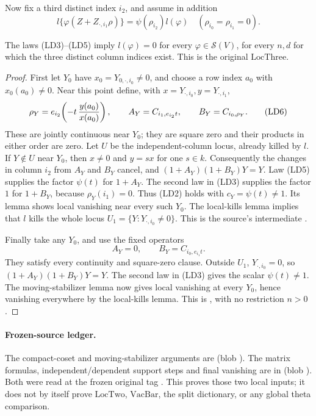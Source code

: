 Now fix a third distinct index \(i_2\), and assume in addition
\[
 l\{\varphi(Z+Z_{\cdot,i_1}\rho)\}
       =\psi(\rho_{i_2})l(\varphi)
                \quad(\rho_{i_0}=\rho_{i_1}=0).
 \tag{LD5}\label{eq:sr-source-second-column-law}
\]

\begin{srproposition}
\label{prop:sr-source-local-three}
The laws (LD3)--(LD5) imply \(l(\varphi)=0\) for every
\(\varphi\in\mathcal S(V)\), for every \(n,d\) for which the
three distinct column indices exist.
This is the original \(\mathrm{LocThree}\).
\end{srproposition}
\begin{proof}
First let \(Y_0\) have \(x_0=Y_{0,\cdot,i_0}\ne0\),
and choose a row index \(a_0\) with \(x_0(a_0)\ne0\).
Near this point define, with \(x=Y_{\cdot,i_0},y=Y_{\cdot,i_1}\),
\[
 \rho_Y=e_{i_2}\!\left(-t\,{y(a_0)\over x(a_0)}\right),
 \qquad A_Y=C_{i_1,e_{i_2}t},\qquad B_Y=C_{i_0,\rho_Y}.
 \tag{LD6}\label{eq:sr-source-dependent-stabilizers}
\]
These are jointly continuous near \(Y_0\); they are square zero
and their products in either order are zero.
Let \(U\) be the independent-column locus, already killed by \(l\).
If \(Y\notin U\) near \(Y_0\), then \(x\ne0\) and \(y=sx\)
for one \(s\in k\).
Consequently the changes in column \(i_2\) from \(A_Y\) and \(B_Y\)
cancel, and \((1+A_Y)(1+B_Y)Y=Y\).
Law (LD5) supplies the factor \(\psi(t)\) for \(1+A_Y\).
The second law in (LD3) supplies the factor \(1\) for \(1+B_Y\),
because \(\rho_Y(i_1)=0\).
Thus (LD2) holds with \(c_Y=\psi(t)\ne1\).
Its lemma shows local vanishing near every such \(Y_0\).
The local-kills lemma implies that \(l\) kills the whole locus
\(U_1=\{Y:Y_{\cdot,i_0}\ne0\}\).
This is the source's intermediate .

Finally take any \(Y_0\), and use the fixed operators
\[
                       A_Y=0,\qquad B_Y=C_{i_0,e_{i_1}t}.
\]
They satisfy every continuity and square-zero clause.
Outside \(U_1\), \(Y_{\cdot,i_0}=0\), so
\((1+A_Y)(1+B_Y)Y=Y\).
The second law in (LD3) gives the scalar \(\psi(t)\ne1\).
The moving-stabilizer lemma now gives local vanishing at every
\(Y_0\), hence vanishing everywhere by the local-kills lemma.
This is , with no restriction \(n>0\).
\end{proof}

\paragraph{Frozen-source ledger.}
The compact-coset and moving-stabilizer arguments are
(blob ).
The matrix formulas, independent/dependent support steps and final
vanishing are in
(blob ).
Both were read at the frozen original tag
.
This proves those two local inputs; it does not by itself prove
\(\mathrm{LocTwo}\), \(\mathrm{VacBar}\), the split dictionary,
or any global theta comparison.

